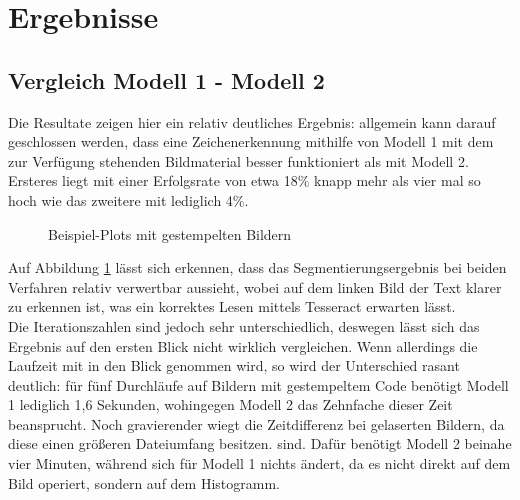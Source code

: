 	\section{Ergebnisse}
	\label{sec:results}
	
		\subsection{Vergleich Modell 1 - Modell 2}
		\label{sub:comp-m1-m2}
			Die Resultate zeigen hier ein relativ deutliches Ergebnis: allgemein kann darauf geschlossen werden, dass eine Zeichenerkennung mithilfe von Modell 1 mit dem zur Verfügung stehenden Bildmaterial besser funktioniert als mit Modell 2. Ersteres liegt mit einer Erfolgsrate von etwa 18\% knapp mehr als vier mal so hoch wie das zweitere mit lediglich 4\%.
			\begin{figure}[H]
				\centering
				\caption{Beispiel-Plots mit gestempelten Bildern}
				\label{fig:vgl-4-1}
			\end{figure}
			Auf Abbildung \ref{fig:vgl-4-1} lässt sich erkennen, dass das Segmentierungsergebnis bei beiden Verfahren relativ verwertbar aussieht, wobei auf dem linken Bild der Text klarer zu erkennen ist, was ein korrektes Lesen mittels Tesseract erwarten lässt. \\
			Die Iterationszahlen sind jedoch sehr unterschiedlich, deswegen lässt sich das Ergebnis auf den ersten Blick nicht wirklich vergleichen. Wenn allerdings die Laufzeit mit in den Blick genommen wird, so wird der Unterschied rasant deutlich: für fünf Durchläufe auf Bildern mit gestempeltem Code benötigt Modell 1 lediglich 1,6 Sekunden, wohingegen Modell 2 das Zehnfache dieser Zeit beansprucht. Noch gravierender wiegt die Zeitdifferenz bei gelaserten Bildern, da diese einen größeren Dateiumfang besitzen. sind. Dafür benötigt Modell 2 beinahe vier Minuten, während sich für Modell 1 nichts ändert, da es nicht direkt auf dem Bild operiert, sondern auf dem Histogramm.\\
